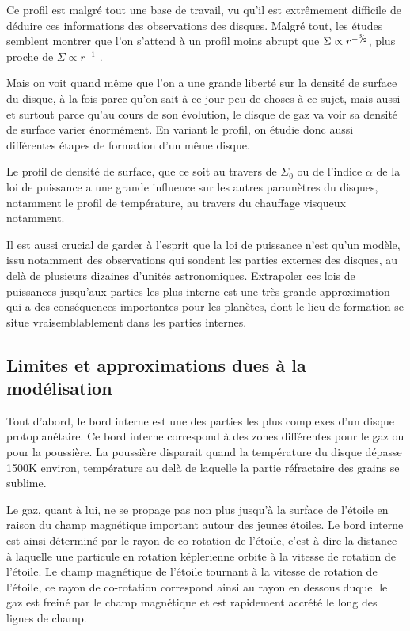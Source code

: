 Ce profil est malgré tout une base de travail, vu qu'il est extrêmement difficile de déduire ces informations des observations des disques. Malgré tout, les études semblent montrer que l'on s'attend à un profil moins abrupt que $\Sigma\propto r^{-{{}^{3\!\!}/ _{\!2}}}$, plus proche de $\Sigma\propto r^{-1}$ \citep{bell1997structure}.

Mais on voit quand même que l'on a une grande liberté sur la densité de surface du disque, à la fois parce qu'on sait à ce jour peu de choses à ce sujet, mais aussi et surtout parce qu'au cours de son évolution, le disque de gaz va voir sa densité de surface varier énormément. En variant le profil, on étudie donc aussi différentes étapes de formation d'un même disque. 

Le profil de densité de surface, que ce soit au travers de $\Sigma_0$ ou de l'indice $\alpha$ de la loi de puissance a une grande influence sur les autres paramètres du disques, notamment le profil de température, au travers du chauffage visqueux notamment. 

Il est aussi crucial de garder à l'esprit que la loi de puissance n'est qu'un modèle, issu notamment des observations qui sondent les parties externes des disques, au delà de plusieurs dizaines d'unités astronomiques. Extrapoler ces lois de puissances jusqu'aux parties les plus interne est une très grande approximation qui a des conséquences importantes pour les planètes, dont le lieu de formation se situe vraisemblablement dans les parties internes.

\subsection{Limites et approximations dues à la modélisation}
Tout d'abord, le bord interne est une des parties les plus complexes d'un disque protoplanétaire. Ce bord interne correspond à des zones différentes pour le gaz ou pour la poussière. La poussière disparait quand la température du disque dépasse 1500K environ, température au delà de laquelle la partie réfractaire des grains se sublime. 

Le gaz, quant à lui, ne se propage pas non plus jusqu'à la surface de l'étoile en raison du champ magnétique important autour des jeunes étoiles. Le bord interne est ainsi déterminé par le rayon de co-rotation de l'étoile, c'est à dire la distance à laquelle une particule en rotation képlerienne orbite à la vitesse de rotation de l'étoile. Le champ magnétique de l'étoile tournant à la vitesse de rotation de l'étoile, ce rayon de co-rotation correspond ainsi au rayon en dessous duquel le gaz est freiné par le champ magnétique et est rapidement accrété le long des lignes de champ. 

